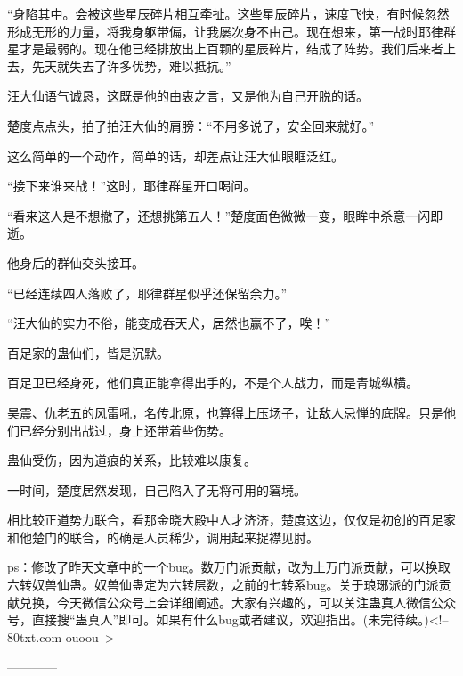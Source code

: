 \begin{this_body}
“身陷其中。会被这些星辰碎片相互牵扯。这些星辰碎片，速度飞快，有时候忽然形成无形的力量，将我身躯带偏，让我屡次身不由己。现在想来，第一战时耶律群星才是最弱的。现在他已经排放出上百颗的星辰碎片，结成了阵势。我们后来者上去，先天就失去了许多优势，难以抵抗。”

汪大仙语气诚恳，这既是他的由衷之言，又是他为自己开脱的话。

楚度点点头，拍了拍汪大仙的肩膀：“不用多说了，安全回来就好。”

这么简单的一个动作，简单的话，却差点让汪大仙眼眶泛红。

“接下来谁来战！”这时，耶律群星开口喝问。

“看来这人是不想撤了，还想挑第五人！”楚度面色微微一变，眼眸中杀意一闪即逝。

他身后的群仙交头接耳。

“已经连续四人落败了，耶律群星似乎还保留余力。”

“汪大仙的实力不俗，能变成吞天犬，居然也赢不了，唉！”

百足家的蛊仙们，皆是沉默。

百足卫已经身死，他们真正能拿得出手的，不是个人战力，而是青城纵横。

昊震、仇老五的风雷吼，名传北原，也算得上压场子，让敌人忌惮的底牌。只是他们已经分别出战过，身上还带着些伤势。

蛊仙受伤，因为道痕的关系，比较难以康复。

一时间，楚度居然发现，自己陷入了无将可用的窘境。

相比较正道势力联合，看那金晓大殿中人才济济，楚度这边，仅仅是初创的百足家和他楚门的联合，的确是人员稀少，调用起来捉襟见肘。

ps：修改了昨天文章中的一个bug。数万门派贡献，改为上万门派贡献，可以换取六转奴兽仙蛊。奴兽仙蛊定为六转层数，之前的七转系bug。关于琅琊派的门派贡献兑换，今天微信公众号上会详细阐述。大家有兴趣的，可以关注蛊真人微信公众号，直接搜“蛊真人”即可。如果有什么bug或者建议，欢迎指出。(未完待续。)<!--80txt.com-ouoou-->

------------

\end{this_body}

